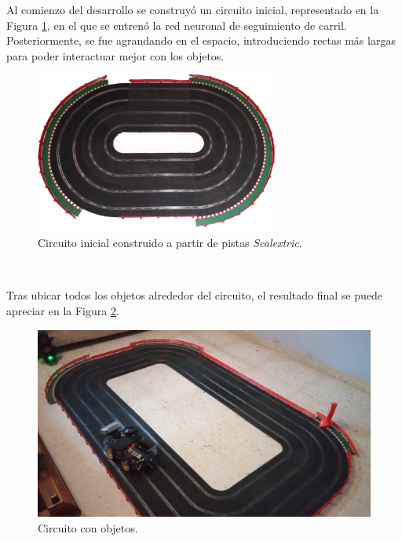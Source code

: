 Al comienzo del desarrollo se construyó un circuito inicial, representado en la Figura \ref{fig:circuit}, en el que se entrenó la red neuronal de seguimiento de carril. Posteriormente, se fue agrandando en el espacio, introduciendo rectas más largas para poder interactuar mejor con los objetos.\\
\begin{figure} [h!]
	\begin{center}
		\includegraphics[width=8cm]{figs/circuit}
	\end{center}
	\caption{Circuito inicial construido a partir de pistas \textit{Scalextric}.}
	\label{fig:circuit}
\end{figure}\

Tras ubicar todos los objetos alrededor del circuito, el resultado final se puede apreciar en la Figura \ref{fig:circuitwithobjects2}.\\

\begin{figure} [h!]
	\begin{center}
		\includegraphics[width=12cm]{figs/circuitwithobjects2}
	\end{center}
	\caption{Circuito con objetos.}
	\label{fig:circuitwithobjects2}
\end{figure}\

